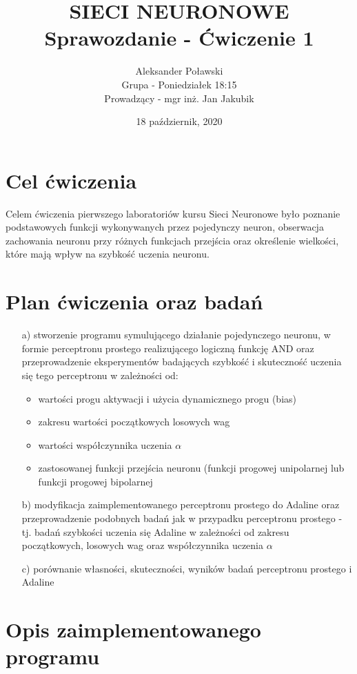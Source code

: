 \documentclass[17pt]{article}
\title{\textbf{SIECI NEURONOWE\\Sprawozdanie - Ćwiczenie 1}}
\author{Aleksander Poławski\\Grupa - Poniedziałek 18:15\\Prowadzący - mgr inż. Jan Jakubik}
\date{18 październik, 2020}
\begin{document}
\maketitle	

\section{Cel ćwiczenia}
Celem ćwiczenia pierwszego laboratoriów kursu Sieci Neuronowe było poznanie podstawowych funkcji wykonywanych przez pojedynczy neuron, obserwacja zachowania neuronu przy różnych funkcjach przejścia oraz określenie wielkości, które mają wpływ na szybkość uczenia neuronu.

\section{Plan ćwiczenia oraz badań}

\begin{enumerate}
\item[a)] stworzenie programu symulującego działanie pojedynczego neuronu, w formie perceptronu prostego realizującego logiczną funkcję AND oraz przeprowadzenie eksperymentów badających szybkość i skuteczność uczenia się tego perceptronu w zależności od:

\begin{itemize}
\item wartości progu aktywacji i użycia dynamicznego progu (bias)
\item zakresu wartości początkowych losowych wag
\item wartości współczynnika uczenia $\alpha$
\item zastosowanej funkcji przejścia neuronu (funkcji progowej unipolarnej lub funkcji progowej bipolarnej
\end{itemize}

\item[b)] modyfikacja zaimplementowanego perceptronu prostego do Adaline oraz przeprowadzenie podobnych badań jak w przypadku perceptronu prostego - tj. badań szybkości uczenia się Adaline w zależności od zakresu początkowych, losowych wag oraz współczynnika uczenia $\alpha$

\item[c)] porównanie własności, skuteczności, wyników badań perceptronu prostego i Adaline

\end{enumerate}

\section{Opis zaimplementowanego programu}
\end{document}
